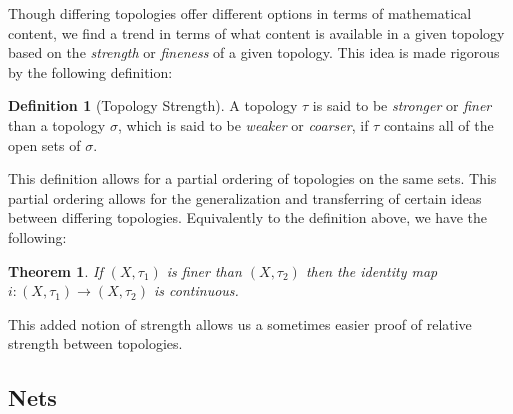 \documentclass{article}
\theoremstyle{plain}
\newtheorem{theorem}{Theorem}
\theoremstyle{definition}
\newtheorem{definition}{Definition}
\begin{document}
                Though differing topologies offer different options in terms of mathematical content, we find a trend in terms of what content is available in a given topology based on the \textit{strength} or \textit{fineness} of a given topology.
                This idea is made rigorous by the following definition:
                \begin{definition}[Topology Strength] \label{def:topology strength}
                        A topology $\tau$ is said to be \textit{stronger} or \textit{finer} than a topology $\sigma$, which is said to be \textit{weaker} or \textit{coarser}, if $\tau$ contains all of the open sets of $\sigma$.
                \end{definition}
                This definition allows for a partial ordering of topologies on the same sets.
                This partial ordering allows for the generalization and transferring of certain ideas between differing topologies.
                Equivalently to the definition above, we have the following:
                \begin{theorem}
                        If $(X, \tau_1)$ is finer than $(X, \tau_2)$ then the identity map $i: (X, \tau_1) \to (X, \tau_2)$ is continuous.
                \end{theorem}
                This added notion of strength allows us a sometimes easier proof of relative strength between topologies.


        \subsection{Nets} \label{sec:nets}
\end{document}
